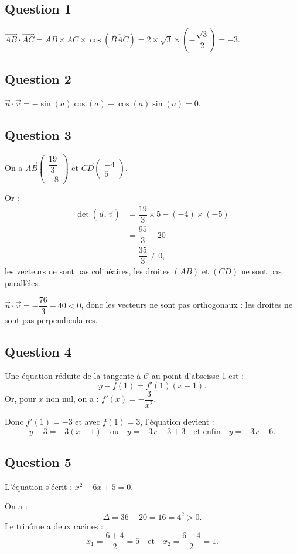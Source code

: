 \subsection*{Question 1}

\(\overrightarrow{AB} \cdot \overrightarrow{AC} = AB \times AC \times \cos(\widehat{BAC}) = 2 \times \sqrt{3} \times \left(-\dfrac{\sqrt{3}}{2}\right) = -3\).

\subsection*{Question 2}

\(\vec{u} \cdot \vec{v} = -\sin(a)\cos(a) + \cos(a)\sin(a) = 0\).

\subsection*{Question 3}

On a \(\overrightarrow{AB}\begin{pmatrix} \dfrac{19}{3} \\ -8 \end{pmatrix}\) et \(\overrightarrow{CD}\begin{pmatrix} -4 \\ 5 \end{pmatrix}\).

Or :
\begin{align*}
\det\left(\vec{u}, \vec{v}\right) &= \dfrac{19}{3} \times 5 - (-4) \times (-5) \\
&= \dfrac{95}{3} - 20 \\
&= \dfrac{35}{3} \neq 0,
\end{align*}
les vecteurs ne sont pas colinéaires, les droites \((AB)\) et \((CD)\) ne sont pas parallèles.

\(\vec{u} \cdot \vec{v} = -\dfrac{76}{3} - 40 < 0\), donc les vecteurs ne sont pas orthogonaux : les droites ne sont pas perpendiculaires.

\subsection*{Question 4}

Une équation réduite de la tangente à \(\mathcal{C}\) au point d'abscisse 1 est :
\[
y - f(1) = f'(1)(x - 1).
\]
Or, pour \(x \) non nul, on a : \(f'(x) = -\dfrac{3}{x^2}\).

Donc \(f'(1) = -3\) et avec \(f(1) = 3\), l'équation devient :
\[
y - 3 = -3(x - 1) \quad \text{ou} \quad y = -3x + 3 + 3 \quad \text{et enfin} \quad y = -3x + 6.
\]

\subsection*{Question 5}

L'équation s'écrit : \(x^2 - 6x + 5 = 0\).

On a :
\[
\Delta = 36 - 20 = 16 = 4^2 > 0.
\]
Le trinôme a deux racines :
\[
x_1 = \dfrac{6 + 4}{2} = 5 \quad \text{et} \quad x_2 = \dfrac{6 - 4}{2} = 1.
\]
